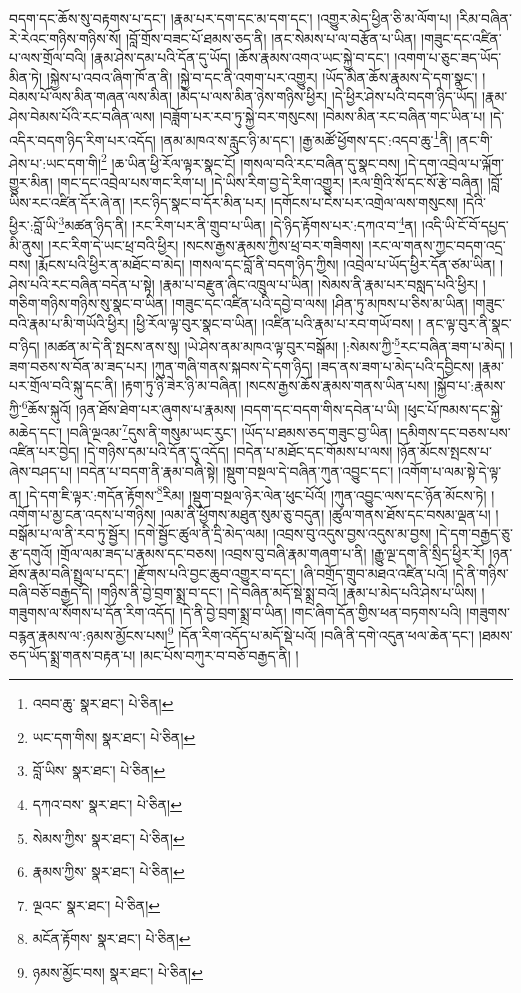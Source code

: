 བདག་དང་ཆོས་སུ་བརྟགས་པ་དང་། །རྣམ་པར་དག་དང་མ་དག་དང་། །འགྱུར་མེད་ཕྱིན་ཅི་མ་ལོག་པ། །རིམ་བཞིན་རེ་རེའང་གཉིས་གཉིས་སོ། །བློ་གྲོས་བཟང་པོ་ཐམས་ཅད་ནི། །ནང་སེམས་པ་ལ་བརྩོན་པ་ཡིན། །གཟུང་དང་འཛིན་པ་ལས་གྲོལ་བའི། །རྣམ་ཤེས་དམ་པའི་དོན་དུ་ཡོད། །ཆོས་རྣམས་འགའ་ཡང་སྐྱེ་བ་དང་། །འགག་པ་ཅུང་ཟད་ཡོད་མིན་ཏེ། །སྐྱེས་པ་འབའ་ཞིག་ཁོ་ན་ནི། །སྐྱེ་བ་དང་ནི་འགག་པར་འགྱུར། །ཡོད་མིན་ཆོས་རྣམས་དེ་དག་སྣང་། །བེམས་པོ་ལས་མིན་གཞན་ལས་མིན། །མེད་པ་ལས་མིན་ཉེས་གཉིས་ཕྱིར། །དེ་ཕྱིར་ཤེས་པའི་བདག་ཉིད་ཡོད། །རྣམ་ཤེས་བེམས་པོའི་རང་བཞིན་ལས། །བཟློག་པར་རབ་ཏུ་སྐྱེ་བར་གསུངས། །བེམས་མིན་རང་བཞིན་གང་ཡིན་པ། །དེ་འདིར་བདག་ཉིད་རིག་པར་འདོད། །ནམ་མཁའ་ས་རླུང་ཉི་མ་དང་། །རྒྱ་མཚོ་ཕྱོགས་དང་:འདབ་ཆུ་\footnote{འབབ་ཆུ་  སྣར་ཐང་།  པེ་ཅིན། }ནི། །ནང་གི་ཤེས་པ་:ཡང་དག་གི།\footnote{ཡང་དག་གིས།  སྣར་ཐང་།  པེ་ཅིན། } །ཆ་ཡིན་ཕྱི་རོལ་ལྟར་སྣང་ངོ། །གསལ་བའི་རང་བཞིན་དུ་སྣང་བས། །དེ་དག་འབྲེལ་པ་ལྐོག་གྱུར་མིན། །གང་དང་འབྲེལ་པས་གང་རིག་པ། །དེ་ཡིས་རིག་བྱ་དེ་རིག་འགྱུར། །རལ་གྲིའི་སོ་དང་སོ་རྩེ་བཞིན། །བློ་ཡིས་རང་འཛིན་དོར་ཞེ་ན། །རང་ཉིད་སྣང་བ་དོར་མིན་པར། །དགོངས་པ་ངེས་པར་འགྲེལ་ལས་གསུངས། །དེའི་ཕྱིར་:བློ་ཡི་\footnote{བློ་ཡིས་  སྣར་ཐང་།  པེ་ཅིན། }མཚན་ཉིད་ནི། །རང་རིག་པར་ནི་གྲུབ་པ་ཡིན། །དེ་ཉིད་རྟོགས་པར་:དཀའ་བ་\footnote{དཀའ་བས་  སྣར་ཐང་།  པེ་ཅིན། }ན། །འདི་ཡི་ངོ་བོ་དཔྱད་མི་ནུས། །རང་རིག་དེ་ཡང་ཕྲ་བའི་ཕྱིར། །སངས་རྒྱས་རྣམས་ཀྱིས་ཕྲ་བར་གཟིགས། །རང་ལ་གནས་ཀྱང་བདག་འདྲ་བས། །རྨོངས་པའི་ཕྱིར་ན་མཐོང་བ་མེད། །གསལ་དང་བློ་ནི་བདག་ཉིད་ཀྱིས། །འབྲེལ་པ་ཡོད་ཕྱིར་དོན་ཙམ་ཡིན། །ཤེས་པའི་རང་བཞིན་བདེན་པ་སྟེ། །རྣམ་པ་བརྫུན་ཞིང་འཁྲུལ་པ་ཡིན། །སེམས་ནི་རྣམ་པར་བསླད་པའི་ཕྱིར། །གཅིག་གཉིས་གཉིས་སུ་སྣང་བ་ཡིན། །གཟུང་དང་འཛིན་པའི་དབྱེ་བ་ལས། །ཤིན་ཏུ་མཁས་པ་ཅིས་མ་ཡིན། །གཟུང་བའི་རྣམ་པ་མི་གཡོའི་ཕྱིར། །ཕྱི་རོལ་ལྟ་བུར་སྣང་བ་ཡིན། །འཛིན་པའི་རྣམ་པ་རབ་གཡོ་བས། །
ནང་ལྟ་བུར་ནི་སྣང་བ་ཉིད། །མཚན་མ་དེ་ནི་སྤངས་ནས་སུ། །ཡེ་ཤེས་ནམ་མཁའ་ལྟ་བུར་བསྒོམ། །:སེམས་ཀྱི་\footnote{སེམས་ཀྱིས་  སྣར་ཐང་།  པེ་ཅིན། }རང་བཞིན་ཟག་པ་མེད། །ཟག་བཅས་ས་བོན་མ་ཟད་པར། །ཀུན་གཞི་གནས་སྐབས་དེ་དག་ཉིད། །ཟད་ནས་ཟག་པ་མེད་པའི་དབྱིངས། །རྣམ་པར་གྲོལ་བའི་སྐུ་དང་ནི། །རྟག་ཏུ་ཉི་ཟེར་ཉི་མ་བཞིན། །སངས་རྒྱས་ཆོས་རྣམས་གནས་ཡིན་པས། །སྐྱོབ་པ་:རྣམས་ཀྱི་\footnote{རྣམས་ཀྱིས་  སྣར་ཐང་།  པེ་ཅིན། }ཆོས་སྐུའོ། །ཉན་ཐོས་ཐེག་པར་ཞུགས་པ་རྣམས། །བདག་དང་བདག་གིས་དབེན་པ་ཡི། །ཕུང་པོ་ཁམས་དང་སྐྱེ་མཆེད་དང་། །བཞི་ལྔའམ་\footnote{ལྔའང་  སྣར་ཐང་།  པེ་ཅིན། }དུས་ནི་གསུམ་ཡང་རུང་། །ཡོད་པ་ཐམས་ཅད་གཟུང་བྱ་ཡིན། །དམིགས་དང་བཅས་པས་འཛིན་པར་བྱེད། །དེ་གཉིས་དམ་པའི་དོན་དུ་འདོད། །བདེན་པ་མཐོང་དང་གོམས་པ་ལས། །ཉོན་མོངས་སྤངས་པ་ཞེས་བཤད་པ། །བདེན་པ་བདག་ནི་རྣམ་བཞི་སྟེ། །སྡུག་བསྔལ་དེ་བཞིན་ཀུན་འབྱུང་དང་། །འགོག་པ་ལམ་སྟེ་དེ་ལྟ་ན། །དེ་དག་ཇི་ལྟར་:གདོན་རྟོགས་\footnote{མངོན་རྟོགས་  སྣར་ཐང་།  པེ་ཅིན། }རིམ། །སྡུག་བསྔལ་ཉེར་ལེན་ཕུང་པོའོ། །ཀུན་འབྱུང་ལས་དང་ཉོན་མོངས་ཏེ། །འགོག་པ་མྱ་ངན་འདས་པ་གཉིས། །ལམ་ནི་ཕྱོགས་མཐུན་སུམ་ཅུ་བདུན། །ཚུལ་གནས་ཐོས་དང་བསམ་ལྡན་པ། །བསྒོམ་པ་ལ་ནི་རབ་ཏུ་སྦྱོར། །དགེ་སྦྱོང་ཚུལ་ནི་དྲི་མེད་ལམ། །འབྲས་བུ་འདུས་བྱས་འདུས་མ་བྱས། །དེ་དག་བརྒྱད་ཅུ་རྩ་དགུའོ། །གྲོལ་ལམ་ཟད་པ་རྣམས་དང་བཅས། །འབྲས་བུ་བཞི་རྣམ་གཞག་པ་ནི། །རྒྱུ་ལྔ་དག་ནི་སྲིད་ཕྱིར་རོ། །ཉན་ཐོས་རྣམ་བཞི་སྤྲུལ་པ་དང་། །རྫོགས་པའི་བྱང་ཆུབ་འགྱུར་བ་དང་། །ཞི་བགྲོད་གྲུབ་མཐའ་འཛིན་པའོ། །དེ་ནི་གཉིས་བཞི་བཅོ་བརྒྱད་དེ། །གཉིས་ནི་བྱེ་བྲག་སྨྲ་བ་དང་། །དེ་བཞིན་མདོ་སྡེ་སྨྲ་བའོ། །རྣམ་པ་མེད་པའི་ཤེས་པ་ཡིས། །གཟུགས་ལ་སོགས་པ་དོན་རིག་འདོད། །དེ་ནི་བྱེ་བྲག་སྨྲ་བ་ཡིན། །གང་ཞིག་དོན་གྱིས་ཕན་བཏགས་པའི། །གཟུགས་བརྙན་རྣམས་ལ་:ཉམས་མྱོངས་པས།\footnote{ཉམས་མྱོང་བས།  སྣར་ཐང་།  པེ་ཅིན། } །དོན་རིག་འདོད་པ་མདོ་སྡེ་པའོ། །བཞི་ནི་དགེ་འདུན་ཕལ་ཆེན་དང་། །ཐམས་ཅད་ཡོད་སྨྲ་གནས་བརྟན་པ། །མང་པོས་བཀུར་བ་བཅོ་བརྒྱད་ནི། །
